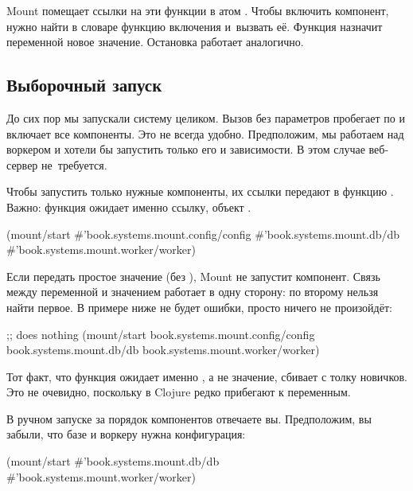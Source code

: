 Mount помещает ссылки на эти функции в атом . Чтобы включить
компонент, нужно найти в словаре функцию включения и~вызвать её. Функция
назначит переменной  новое значение. Остановка работает
аналогично.

\subsection{Выборочный запуск}

\label{mount-selective}

До сих пор мы запускали систему целиком. Вызов  без
параметров пробегает по  и включает все компоненты. Это не
всегда удобно. Предположим, мы работаем над воркером и хотели бы запустить
только его и зависимости. В этом случае веб-сервер не~требуется.

Чтобы запустить только нужные компоненты, их ссылки передают в функцию
. Важно: функция ожидает именно ссылку, объект .

\begin{clojure}
(mount/start
  #'book.systems.mount.config/config
  #'book.systems.mount.db/db
  #'book.systems.mount.worker/worker)
\end{clojure}

Если передать простое значение (без ), Mount не запустит
компонент. Связь между переменной и значением работает в одну сторону: по
второму нельзя найти первое. В примере ниже не будет ошибки, просто ничего не
произойдёт:

\pagebreakafive

\begin{clojure}
;; does nothing
(mount/start
  book.systems.mount.config/config
  book.systems.mount.db/db
  book.systems.mount.worker/worker)
\end{clojure}


Тот факт, что функция ожидает именно , а не значение, сбивает с толку
новичков. Это не очевидно, поскольку в Clojure редко прибегают к переменным.

В ручном запуске за порядок компонентов отвечаете вы. Предположим, вы забыли,
что базе и воркеру нужна конфигурация:

\begin{clojure}
(mount/start
  #'book.systems.mount.db/db
  #'book.systems.mount.worker/worker)
\end{clojure}

